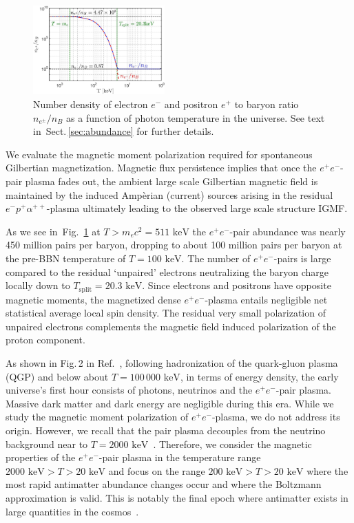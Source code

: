 \documentclass[aps,prd,floatfix,reprint]{revtex4-2}
\newcommand*{\keV}{\text{ keV}}
\newcommand{\rf}[1]{Fig.~{\ref{#1}}}
\newcommand{\rsec}[1]{Sect.\,{\ref{#1}}}
\begin{document}
\begin{figure}[ht]
 \centering
\includegraphics[width=0.45\textwidth]{plots/EEPlasmaDensityRatio_new01.jpg}
 \caption{Number density of electron $e^{-}$ and positron $e^{+}$ to baryon ratio $n_{e^{\pm}}/n_{B}$ as a function of photon temperature in the universe. See text in~\rsec{sec:abundance} for further details.}
 \label{fig:densityratio} 
\end{figure}

We evaluate the magnetic moment polarization required for spontaneous Gilbertian magnetization. Magnetic flux persistence implies that once the $e^{+}e^{-}$-pair plasma fades out, the ambient large scale Gilbertian magnetic field is maintained by the induced Amp{\`e}rian (current) sources arising in the residual $e^{-}p^{+}\alpha^{++}$-plasma ultimately leading to the observed large scale structure IGMF. 

As we see in~\rf{fig:densityratio} at $T>m_ec^2=511\keV$ the $e^{+}e^{-}$-pair abundance was nearly 450 million pairs per baryon, dropping to about 100 million pairs per baryon at the pre-BBN temperature of $T=100\keV$. The number of $e^{+}e^{-}$-pairs is large compared to the residual `unpaired' electrons neutralizing the baryon charge locally down to $T_\mathrm{split}=20.3\keV$. Since electrons and positrons have opposite magnetic moments, the magnetized dense $e^{+}e^{-}$-plasma entails negligible net statistical average local spin density. The residual very small polarization of unpaired electrons complements the magnetic field induced polarization of the proton component. 

As shown in Fig.\,2 in Ref.~\cite{Rafelski:2023emw}, following hadronization of the quark-gluon plasma (QGP) and below about $T\!=\!100\,000\keV$, in terms of energy density, the early universe's first hour consists of photons, neutrinos and the $e^{+}e^{-}$-pair plasma. Massive dark matter and dark energy are negligible during this era. While we study the magnetic moment polarization of $e^{+}e^{-}$-plasma, we do not address its origin. However, we recall that the pair plasma decouples from the neutrino background near to $T=2000\keV$~\cite{Birrell:2014uka}. Therefore, we consider the magnetic properties of the $e^{+}e^{-}$-pair plasma in the temperature range $2000\keV>T>20\keV$ and focus on the range $200\keV>T>20\keV$ where the most rapid antimatter abundance changes occur and where the Boltzmann approximation is valid. This is notably the final epoch where antimatter exists in large quantities in the cosmos~\cite{Rafelski:2023emw}. 
\end{document}
